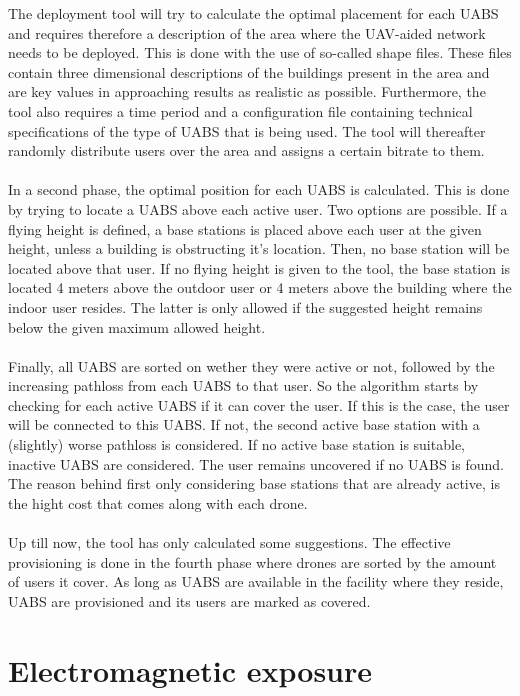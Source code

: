 The deployment tool will try to calculate the optimal placement for each \gls{UABS} and requires therefore a description of the area where the UAV-aided network needs to 
be deployed. This is done with the use of so-called shape files. These files contain three dimensional descriptions of the buildings present in the area and are
key values in approaching results as realistic as possible. Furthermore, the tool also requires a time period and a configuration file containing technical specifications of the type of \gls{UABS} that is being used. 
The tool will thereafter randomly distribute users over the area and assigns a certain bitrate to them. \\
\\
In a second phase, the optimal position for each \gls{UABS} is calculated. This is done by trying to locate a \gls{UABS} above each active user. Two options are possible.
If a flying height is defined, a base stations is placed above each user at the given height, unless a building is obstructing it's location. Then, no base station will be located above that user.
If no flying height is given to the tool, the base station is located 4 meters above the outdoor user or 4 meters above the building where the indoor user resides. 
The latter is only allowed if the suggested height remains below the given maximum allowed height. \\
\\
Finally, all \gls{UABS} are sorted on wether they were active or not, followed by the increasing pathloss from each \gls{UABS} to that user.
So the algorithm starts by checking for each active \gls{UABS} if it can cover the user. If this is the case, the user will be connected to this \gls{UABS}. If not,
the second active base station with a (slightly) worse pathloss is considered. If no active base station is suitable, inactive \gls{UABS} are considered. The user remains uncovered if no \gls{UABS}
is found. The reason behind first only considering base stations that are already active, is the hight cost that comes along with each drone. \\
\\
Up till now, the tool has only calculated some suggestions. The effective provisioning is done in the fourth phase where drones are sorted by the amount of users it cover. As long as \gls{UABS}
are available in the facility where they reside, \gls{UABS} are provisioned and its users are marked as covered.


\section{Electromagnetic exposure}

